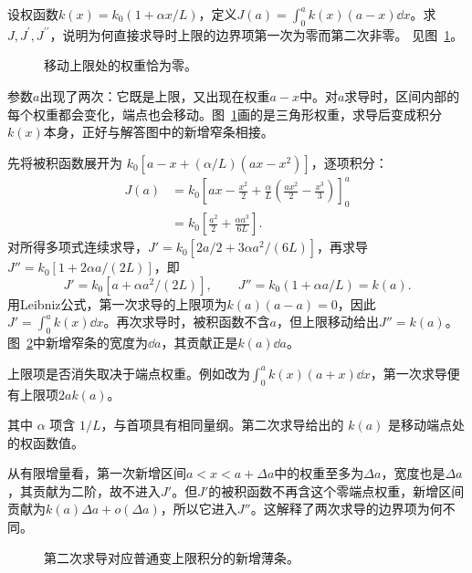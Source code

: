 \begin{exercise}[积分限变化产生的边界项]\label{ex:c1-h16}
设权函数$k(x)=k_0(1+\alpha x/L)$，定义$J(a)=\int_0^a k(x)(a-x)\dd x$。求$J,J^{\prime},J^{\prime\prime}$，说明为何直接求导时上限的边界项第一次为零而第二次非零。 见图~\ref{fig:c1-h16-q}。
\end{exercise}

\begin{figure}[H]\centering
{}
\caption{移动上限处的权重恰为零。}\label{fig:c1-h16-q}
\end{figure}
\begin{solution}
参数$a$出现了两次：它既是上限，又出现在权重$a-x$中。对$a$求导时，区间内部的每个权重都会变化，端点也会移动。图~\ref{fig:c1-h16-q}画的是三角形权重，求导后变成积分$k(x)$本身，正好与解答图中的新增窄条相接。


先将被积函数展开为 $k_0[a-x+(\alpha/L)(ax-x^2)]$，逐项积分：
\[
\begin{aligned}
J(a)&=k_0\left[ax-\frac{x^2}{2}+\frac\alpha L\left(\frac{ax^2}{2}-\frac{x^3}{3}\right)\right]_0^a\\
&=k_0\left[\frac{a^2}{2}+\frac{\alpha a^3}{6L}\right].
\end{aligned}
\]
对所得多项式连续求导，$J'=k_0[2a/2+3\alpha a^2/(6L)]$，再求导 $J''=k_0[1+2\alpha a/(2L)]$，即
\[\boxed{J'=k_0[a+\alpha a^2/(2L)],\qquad J''=k_0(1+\alpha a/L)=k(a)}.\]
用Leibniz公式，第一次求导的上限项为$k(a)(a-a)=0$，因此$J'=\int_0^ak(x)\dd x$。再次求导时，被积函数不含$a$，但上限移动给出$J''=k(a)$。图~\ref{fig:c1-h16-s}中新增窄条的宽度为$\dd a$，其贡献正是$k(a)\dd a$。

上限项是否消失取决于端点权重。例如改为$\int_0^ak(x)(a+x)\dd x$，第一次求导便有上限项$2ak(a)$。


其中 $\alpha$ 项含 $1/L$，与首项具有相同量纲。第二次求导给出的 $k(a)$ 是移动端点处的权函数值。

从有限增量看，第一次新增区间$a<x<a+\Delta a$中的权重至多为$\Delta a$，宽度也是$\Delta a$，其贡献为二阶，故不进入$J'$。但$J'$的被积函数不再含这个零端点权重，新增区间贡献为$k(a)\Delta a+o(\Delta a)$，所以它进入$J''$。这解释了两次求导的边界项为何不同。

\begin{figure}[H]\centering
{}
\caption{第二次求导对应普通变上限积分的新增薄条。}\label{fig:c1-h16-s}
\end{figure}
\end{solution}

